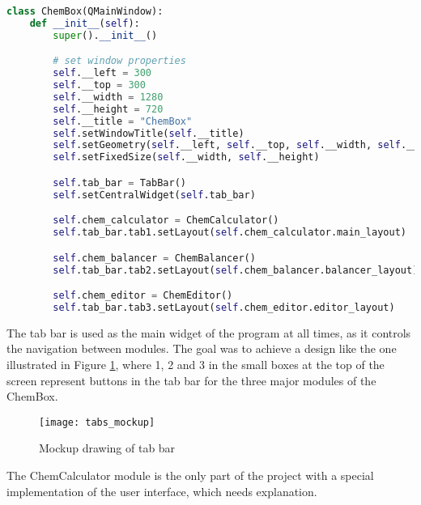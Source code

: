 \documentclass[a4paper,12pt]{article}
\begin{document}
\begin{lstlisting}[language=Python, caption=Code snippet of ChemBox class, label={lst:chembox_snippet}]
class ChemBox(QMainWindow):
    def __init__(self):
        super().__init__()

        # set window properties
        self.__left = 300
        self.__top = 300
        self.__width = 1280
        self.__height = 720
        self.__title = "ChemBox"
        self.setWindowTitle(self.__title)
        self.setGeometry(self.__left, self.__top, self.__width, self.__height)
        self.setFixedSize(self.__width, self.__height)

        self.tab_bar = TabBar()
        self.setCentralWidget(self.tab_bar)

        self.chem_calculator = ChemCalculator()
        self.tab_bar.tab1.setLayout(self.chem_calculator.main_layout)

        self.chem_balancer = ChemBalancer()
        self.tab_bar.tab2.setLayout(self.chem_balancer.balancer_layout)

        self.chem_editor = ChemEditor()
        self.tab_bar.tab3.setLayout(self.chem_editor.editor_layout)
\end{lstlisting}

\newpage
The tab bar is used as the main widget of the program at all times, as it controls the navigation between modules.
The goal was to achieve a design like the one illustrated in Figure \ref{fig:tabs_mockup}, where 1, 2 and 3 in the small boxes at the top of the screen represent buttons in the tab bar for the three major modules of the ChemBox.

\begin{figure} [h]
	\centering
	\texttt{[image: tabs\_mockup]}
	\caption{Mockup drawing of tab bar}
	\label{fig:tabs_mockup}
\end{figure}

The ChemCalculator module is the only part of the project with a special implementation of the user interface, which needs explanation.\\
\end{document}
